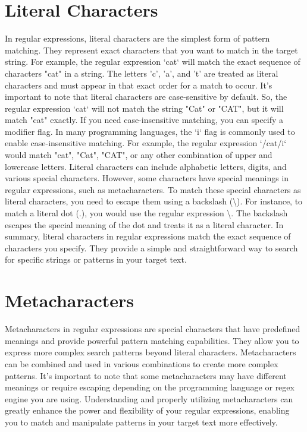 \documentclass{report}
\begin{document}
    \section{Literal Characters}
    In regular expressions, literal characters are the simplest form of pattern matching. They represent exact characters that you want to match in the target string.
    \bigbreak \noindent 
    For example, the regular expression `cat` will match the exact sequence of characters "cat" in a string. The letters 'c', 'a', and 't' are treated as literal characters and must appear in that exact order for a match to occur.
    \bigbreak \noindent 
    It's important to note that literal characters are case-sensitive by default. So, the regular expression `cat` will not match the string "Cat" or "CAT", but it will match "cat" exactly.
    \bigbreak \noindent 
    If you need case-insensitive matching, you can specify a modifier flag. In many programming languages, the `i` flag is commonly used to enable case-insensitive matching. For example, the regular expression `/cat/i` would match "cat", "Cat", "CAT", or any other combination of upper and lowercase letters.
    \bigbreak \noindent 
    Literal characters can include alphabetic letters, digits, and various special characters. However, some characters have special meanings in regular expressions, such as metacharacters. To match these special characters as literal characters, you need to escape them using a backslash (\textbackslash).
    \bigbreak \noindent 
    For instance, to match a literal dot (.), you would use the regular expression \textbackslash. The backslash escapes the special meaning of the dot and treats it as a literal character.
    \bigbreak \noindent 
    In summary, literal characters in regular expressions match the exact sequence of characters you specify. They provide a simple and straightforward way to search for specific strings or patterns in your target text.

    \pagebreak
    \bigbreak
    \noindent

    \section{Metacharacters}
    Metacharacters in regular expressions are special characters that have predefined meanings and provide powerful pattern matching capabilities. They allow you to express more complex search patterns beyond literal characters.
    \bigbreak \noindent 
    Metacharacters can be combined and used in various combinations to create more complex patterns. It's important to note that some metacharacters may have different meanings or require escaping depending on the programming language or regex engine you are using.
    \bigbreak \noindent 
    Understanding and properly utilizing metacharacters can greatly enhance the power and flexibility of your regular expressions, enabling you to match and manipulate patterns in your target text more effectively.
    \bigbreak \noindent 
\end{document}
